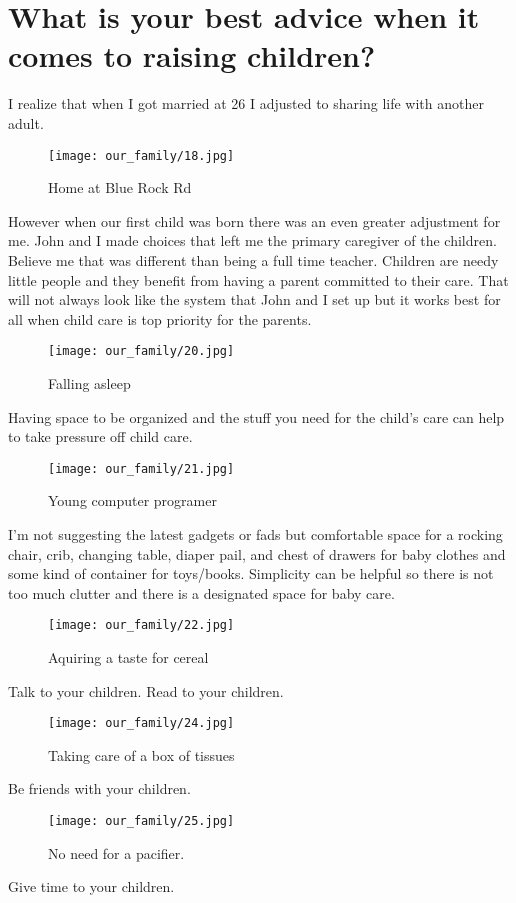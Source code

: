 \section{What is your best advice when it comes to raising children?}
I realize that when I got married at 26 I adjusted to sharing life with another adult.
\begin{figure}
\centering
\texttt{[image: our\_family/18.jpg]}
\caption{
Home at Blue Rock Rd
}
\end{figure}
However when our first child was born there was an even greater adjustment for me.
John and I made choices that left me the primary caregiver of the children.
Believe me that was different than being a full time teacher.
Children are needy little people and they benefit from having a parent committed to their care.
That will not always look like the system that John and I set up but it works best for all when child care is top priority for the parents.
\begin{figure}
\centering
\texttt{[image: our\_family/20.jpg]}
\caption{
Falling asleep
}
\end{figure}

Having space to be organized and the stuff you need for the child's care can help to take pressure off child care.
\begin{figure}
\centering
\texttt{[image: our\_family/21.jpg]}
\caption{
Young computer programer
}
\end{figure}
I'm not suggesting the latest gadgets or fads but comfortable space for a rocking chair, crib, changing table, diaper pail, and chest of drawers for baby clothes and some kind of container for toys/books.
Simplicity can be helpful so there is not too much clutter and there is a designated space for baby care.
\begin{figure}
\centering
\texttt{[image: our\_family/22.jpg]}
\caption{
Aquiring a taste for cereal
}
\end{figure}

Talk to your children.
Read to your children.

\begin{figure}
\centering
\texttt{[image: our\_family/24.jpg]}
\caption{
Taking care of a box of tissues
}
\end{figure}
Be friends with your children.

\begin{figure}
\centering
\texttt{[image: our\_family/25.jpg]}
\caption{
No need for a pacifier. 
}
\end{figure}
Give time to your children.

